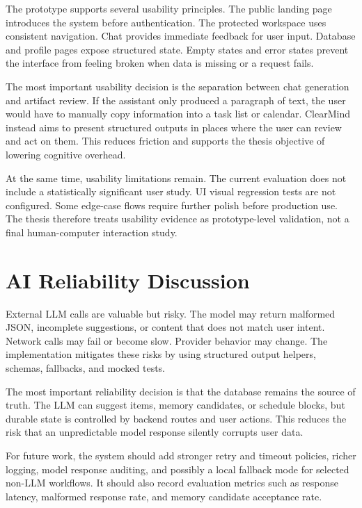 The prototype supports several usability principles. The public landing page introduces the system before authentication. The protected workspace uses consistent navigation. Chat provides immediate feedback for user input. Database and profile pages expose structured state. Empty states and error states prevent the interface from feeling broken when data is missing or a request fails.

The most important usability decision is the separation between chat generation and artifact review. If the assistant only produced a paragraph of text, the user would have to manually copy information into a task list or calendar. ClearMind instead aims to present structured outputs in places where the user can review and act on them. This reduces friction and supports the thesis objective of lowering cognitive overhead.

At the same time, usability limitations remain. The current evaluation does not include a statistically significant user study. UI visual regression tests are not configured. Some edge-case flows require further polish before production use. The thesis therefore treats usability evidence as prototype-level validation, not a final human-computer interaction study.

\section{AI Reliability Discussion}

External LLM calls are valuable but risky. The model may return malformed JSON, incomplete suggestions, or content that does not match user intent. Network calls may fail or become slow. Provider behavior may change. The implementation mitigates these risks by using structured output helpers, schemas, fallbacks, and mocked tests.

The most important reliability decision is that the database remains the source of truth. The LLM can suggest items, memory candidates, or schedule blocks, but durable state is controlled by backend routes and user actions. This reduces the risk that an unpredictable model response silently corrupts user data.

For future work, the system should add stronger retry and timeout policies, richer logging, model response auditing, and possibly a local fallback mode for selected non-LLM workflows. It should also record evaluation metrics such as response latency, malformed response rate, and memory candidate acceptance rate.


